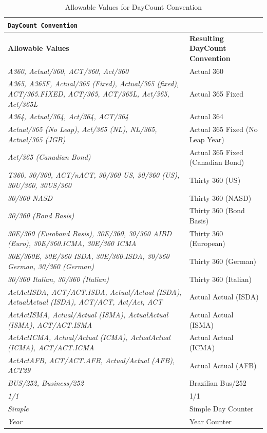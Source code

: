 \begin{table}[H]
\centering
  \begin{tabular} {|p{6cm}|p{6cm}|}
    \hline
    \multicolumn{2}{|l|}{\tt DayCount Convention}                          \\ \hline
    \bfseries{Allowable Values} & \bfseries{Resulting DayCount Convention} \\
    \hline
    \emph{A360, Actual/360, ACT/360, Act/360}& Actual 360  \\ \hline
    \emph{A365, A365F, Actual/365 (Fixed), Actual/365 (fixed), ACT/365.FIXED, ACT/365, ACT/365L, Act/365, Act/365L} & Actual 365 Fixed \\ \hline
    \emph{A364, Actual/364, Act/364, ACT/364}& Actual 364  \\ \hline
    \emph{Actual/365 (No Leap), Act/365 (NL), NL/365, Actual/365 (JGB)} & Actual 365 Fixed (No Leap Year)\\ \hline
    \emph{Act/365 (Canadian Bond)} & Actual 365 Fixed (Canadian Bond)\\ \hline
    \emph{T360, 30/360, ACT/nACT, 30/360 US, 30/360 (US), 30U/360, 30US/360} & Thirty 360 (US) \\ \hline
    \emph{30/360 NASD} & Thirty 360 (NASD) \\ \hline
    \emph{30/360 (Bond Basis)} & Thirty 360 (Bond Basis) \\ \hline
    \emph{30E/360 (Eurobond Basis), 30E/360, 30/360 AIBD (Euro), 30E/360.ICMA, 30E/360 ICMA} & Thirty 360 (European) \\ \hline
    \emph{30E/360E, 30E/360 ISDA, 30E/360.ISDA, 30/360 German, 30/360 (German)} & Thirty 360 (German) \\ \hline
    \emph{30/360 Italian, 30/360 (Italian)} & Thirty 360 (Italian) \\ \hline
    \emph{ActActISDA, ACT/ACT.ISDA, Actual/Actual (ISDA), ActualActual (ISDA), ACT/ACT, Act/Act, ACT} & Actual Actual (ISDA) \\ \hline
    \emph{ActActISMA, Actual/Actual (ISMA), ActualActual (ISMA), ACT/ACT.ISMA} & Actual Actual (ISMA) \\ \hline
    \emph{ActActICMA, Actual/Actual (ICMA), ActualActual (ICMA), ACT/ACT.ICMA} & Actual Actual (ICMA) \\ \hline
    \emph{ActActAFB, ACT/ACT.AFB, Actual/Actual (AFB), ACT29} & Actual Actual (AFB) \\ \hline
    \emph{BUS/252, Business/252} & Brazilian Bus/252 \\ \hline
    \emph{1/1} & 1/1  \\ \hline
    \emph{Simple} & Simple Day Counter  \\ \hline
    \emph{Year} & Year Counter  \\ \hline
  \end{tabular}
  \caption{Allowable Values for DayCount Convention}
  \label{tab:daycount}
\end{table}

